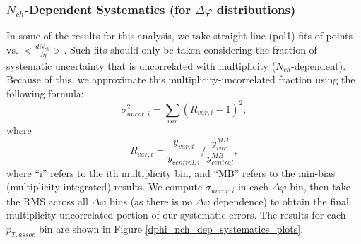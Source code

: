 \documentclass[ALICE,manyauthors]{ALICE_analysis_notes}
\begin{document}
\clearpage

\subsubsection{$N_{ch}$-Dependent Systematics (for $\Delta\varphi$ distributions)}

\label{nch_dep_systematics_dphi}
In some of the results for this analysis, we take straight-line (pol1) fits of points vs. $<\frac{dN_{ch}}{d\eta}>$. Such fits should only be taken considering the fraction of systematic uncertainty that is uncorrelated with multiplicity ($N_{ch}$-dependent). Because of this, we approximate this multiplicity-uncorrelated fraction using the following formula:
\begin{equation}
\sigma_{uncor, i}^2 = \sum_{var}(R_{var, i} - 1)^2,
\end{equation}
where 
\begin{equation}
R_{var, i} = \frac{y_{var, i}}{y_{central, i}}/ \frac{y_{var}^{MB}}{y_{central}^{MB}},
\end{equation}
where ``i'' refers to the ith multiplicity bin, and ``MB'' refers to the min-bias (multiplicity-integrated) results. We compute $\sigma_{uncor, i}$ in each $\Delta\varphi$ bin, then take the RMS across all $\Delta\varphi$ bins (as there is no $\Delta\varphi$ dependence) to obtain the final multiplicity-uncorrelated portion of our systematic errors. The results for each $p_{T, assoc}$ bin are shown in Figure \ref{dphi_nch_dep_systematics_plots}.

\clearpage
\end{document}
